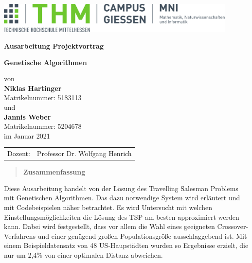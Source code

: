 \documentclass[%
	BCOR=8.25mm,         %
	DIV=12,              %
	parskip=half,				 %
	bibliography=totoc,	 %
	headsepline=on,      %
	cleardoublepage=plain %
	]{scrartcl}
\begin{document}

\begin{titlepage}
	\begin{center}
	\includegraphics[width=0.9\textwidth]{img/mni-logo}
	
	\vspace{3cm}	

	\huge\textbf{\sffamily Ausarbeitung Projektvortrag}

	\vspace{1cm}	

	\Huge\textbf{\sffamily Genetische Algorithmen}

	\normalsize
	\vspace{1cm}

	von \\[1cm]	

	\Huge\textbf{Niklas Hartinger}\\ [.5cm]\normalsize
	Matrikelnummer: 5183113\\ [.75cm]
	
	und \\[1cm]	
	
	\LARGE\textbf{Jannis Weber}\\ [.5cm]\normalsize
	Matrikelnummer: 5204678\\ [.75cm]
	
	im Januar 2021
	\end{center}
	\vfill
	\begin{tabular}{ll}
		Dozent: & Professor Dr. Wolfgang Henrich 
	\end{tabular}
\end{titlepage}

\pagestyle{entrypage}
\setcounter{page}{1}
\begin{quote}
	\vspace*{4cm}

	\begin{center}
		\textbf{\Large\sffamily Zusammenfassung}
	\end{center}
	\vspace*{.5cm}
	
\end{quote}

	Diese Ausarbeitung handelt von der Lösung des Travelling Salesman Problems mit Genetischen Algorithmen. Das dazu notwendige System wird erläutert und mit Codebeispielen näher betrachtet.
	Es wird Untersucht mit welchen Einstellungsmöglichkeiten die Lösung des TSP am besten approximiert werden kann. Dabei wird festgestellt, dass vor allem die Wahl eines geeigneten Crossover-Verfahrens und einer genügend großen Populationsgröße ausschlaggebend ist.
	Mit einem Beispieldatensatz von 48 US-Haupstädten wurden so Ergebnisse erzielt, die nur um 2,4\% von einer optimalen Distanz abweichen.
	
\end{document}
